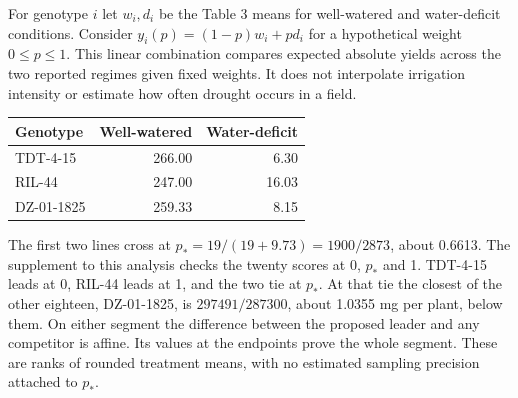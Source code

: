\documentclass[11pt]{article}
\begin{document}
For genotype $i$ let $w_i,d_i$ be the Table 3 means for well-watered and water-deficit conditions. Consider $y_i(p)=(1-p)w_i+p d_i$ for a hypothetical weight $0\leq p\leq1$. This linear combination compares expected absolute yields across the two reported regimes given fixed weights. It does not interpolate irrigation intensity or estimate how often drought occurs in a field.
\begin{center}
\begin{tabular}{lrr}
\toprule
Genotype & Well-watered & Water-deficit\\
\midrule
TDT-4-15 &266.00&6.30\\
RIL-44 &247.00&16.03\\
DZ-01-1825 &259.33&8.15\\
\bottomrule
\end{tabular}
\end{center}
The first two lines cross at $p_* = 19/(19+9.73)=1900/2873$, about 0.6613. The supplement to this analysis checks the twenty scores at 0, $p_*$ and 1. TDT-4-15 leads at 0, RIL-44 leads at 1, and the two tie at $p_*$. At that tie the closest of the other eighteen, DZ-01-1825, is $297491/287300$, about 1.0355 mg per plant, below them. On either segment the difference between the proposed leader and any competitor is affine. Its values at the endpoints prove the whole segment. These are ranks of rounded treatment means, with no estimated sampling precision attached to $p_*$.
\end{document}
